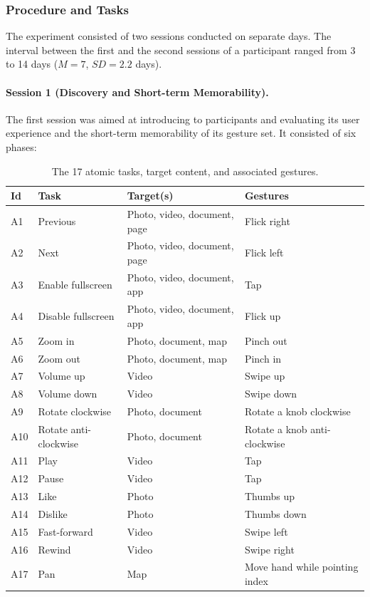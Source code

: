 \subsubsection{Procedure and Tasks}
The experiment consisted of two sessions conducted on separate days. The interval between the first and the second sessions of a participant ranged from 3 to 14 days ($M{=}7$, $SD{=}2.2$ days). 

\paragraph{Session 1 (Discovery and Short-term Memorability).} The first session was aimed at introducing \lui to participants and evaluating its user experience and the short-term memorability of its gesture set. It consisted of six phases:

\begin{table}[!tb]
    \footnotesize
    \centering
    \renewcommand{\arraystretch}{1.1}
    \captionsetup{justification=centering}
    \begin{tabular}{llp{3.7cm}>{\raggedright\arraybackslash}p{3.4cm}}
        \toprule
        \textbf{Id} & \textbf{Task} & \textbf{Target(s)} & \textbf{Gestures}\\
        \midrule
        A1 & Previous & Photo, video, document, page & Flick right \\
        A2 & Next & Photo, video, document, page & Flick left \\
        A3 & Enable fullscreen & Photo, video, document, app & Tap \\
        A4 & Disable fullscreen & Photo, video, document, app & Flick up \\
        A5 & Zoom in & Photo, document, map & Pinch out \\
        A6 & Zoom out & Photo, document, map & Pinch in \\
        A7 & Volume up & Video & Swipe up \\
        A8 & Volume down & Video & Swipe down \\
        A9 & Rotate clockwise & Photo, document & Rotate a knob clockwise \\
        A10 & Rotate anti-clockwise & Photo, document & Rotate a knob anti-clockwise \\
        A11 & Play & Video & Tap \\
        A12 & Pause & Video & Tap \\
        A13 & Like & Photo & Thumbs up \\
        A14 & Dislike & Photo & Thumbs down \\
        A15 & Fast-forward & Video & Swipe left\\
        A16 & Rewind & Video & Swipe right \\
        A17 & Pan & Map & Move hand while pointing index \\
        \bottomrule
    \end{tabular}
    \vspace{-4pt}
    \caption{The 17 atomic tasks, target content, and associated gestures.}
    \label{tab:lui:tasks-atomic}
\end{table}


